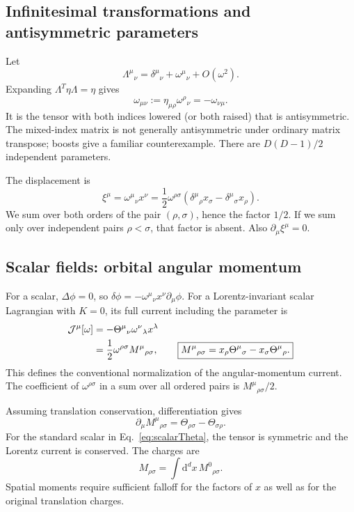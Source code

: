 \documentclass[11pt]{article}
\newcommand{\dd}{\mathrm{d}}
\newcommand{\Th}{\Theta}
\begin{document}
\subsection{Infinitesimal transformations and antisymmetric parameters}
Let
\begin{equation}
\Lambda^\mu{}_{\nu}=\delta^\mu{}_{\nu}+\omega^\mu{}_{\nu}
+O(\omega^2).
\end{equation}
Expanding \(\Lambda^T\eta\Lambda=\eta\) gives
\begin{equation}
\omega_{\mu\nu}:=\eta_{\mu\rho}\omega^\rho{}_{\nu}
=-\omega_{\nu\mu}.
\label{eq:omegaAntisym}
\end{equation}
It is the tensor with both indices lowered (or both raised) that is
antisymmetric. The mixed-index matrix is not generally antisymmetric
under ordinary matrix transpose; boosts give a familiar counterexample.
There are \(D(D-1)/2\) independent parameters.

The displacement is
\begin{equation}
\xi^\mu=\omega^\mu{}_{\nu}x^\nu
=\frac12\omega^{\rho\sigma}
\left(\delta^\mu{}_{\rho}x_\sigma-\delta^\mu{}_{\sigma}x_\rho\right).
\label{eq:LorentzXi}
\end{equation}
We sum over both orders of the pair \((\rho,\sigma)\), hence the factor
\(1/2\). If we sum only over independent pairs \(\rho<\sigma\), that
factor is absent. Also \(\partial_\mu\xi^\mu=0\).

\subsection{Scalar fields: orbital angular momentum}
For a scalar, \(\Delta\phi=0\), so
\(\delta\phi=-\omega^\mu{}_{\nu}x^\nu\partial_\mu\phi\).
For a Lorentz-invariant scalar Lagrangian with \(K=0\), its full current
including the parameter is
\begin{align}
\mathcal J^\mu[\omega]
&=-\Th^\mu{}_{\nu}\omega^\nu{}_{\lambda}x^\lambda\notag\\
&=\frac12\omega^{\rho\sigma}M^\mu{}_{\rho\sigma},
\qquad
\boxed{M^\mu{}_{\rho\sigma}
=x_\rho\Th^\mu{}_{\sigma}-x_\sigma\Th^\mu{}_{\rho}.}
\label{eq:orbitalM}
\end{align}
This defines the conventional normalization of the angular-momentum
current. The coefficient of \(\omega^{\rho\sigma}\) in a sum over all
ordered pairs is \(M^\mu{}_{\rho\sigma}/2\).

Assuming translation conservation, differentiation gives
\begin{equation}
\partial_\mu M^\mu{}_{\rho\sigma}
=\Th_{\rho\sigma}-\Th_{\sigma\rho}.
\label{eq:orbitalDivergence}
\end{equation}
For the standard scalar in Eq.~\eqref{eq:scalarTheta}, the tensor is
symmetric and the Lorentz current is conserved. The charges are
\begin{equation}
M_{\rho\sigma}=\int\dd^d x\,M^0{}_{\rho\sigma}.
\label{eq:LorentzCharge}
\end{equation}
Spatial moments require sufficient falloff for the factors of \(x\) as
well as for the original translation charges.
\end{document}
